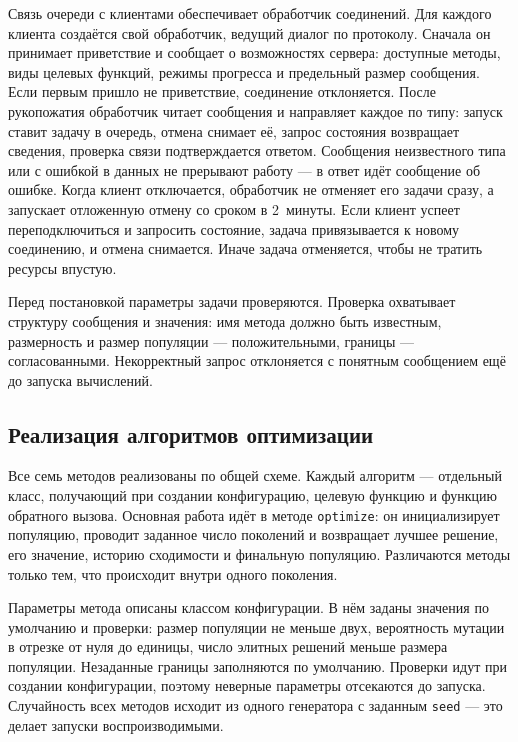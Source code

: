\documentclass[14pt, a4paper]{extarticle}
\begin{document}
Связь очереди с клиентами обеспечивает обработчик соединений. Для каждого клиента
создаётся свой обработчик, ведущий диалог по протоколу. Сначала он принимает
приветствие и сообщает о возможностях сервера: доступные методы, виды целевых
функций, режимы прогресса и предельный размер сообщения. Если первым пришло не
приветствие, соединение отклоняется. После рукопожатия обработчик читает сообщения
и направляет каждое по типу: запуск ставит задачу в очередь, отмена снимает её,
запрос состояния возвращает сведения, проверка связи подтверждается ответом.
Сообщения неизвестного типа или с ошибкой в данных не прерывают работу --- в ответ
идёт сообщение об ошибке. Когда клиент отключается, обработчик не отменяет его
задачи сразу, а запускает отложенную отмену со сроком в 2~минуты. Если клиент успеет
переподключиться и запросить состояние, задача привязывается к новому соединению, и
отмена снимается. Иначе задача отменяется, чтобы не тратить ресурсы впустую.

Перед постановкой параметры задачи проверяются. Проверка охватывает структуру
сообщения и значения: имя метода должно быть известным, размерность и размер
популяции --- положительными, границы --- согласованными. Некорректный запрос
отклоняется с понятным сообщением ещё до запуска вычислений.

\subsection{Реализация алгоритмов оптимизации}
\label{subsec:algo-impl}

Все семь методов реализованы по общей схеме. Каждый алгоритм --- отдельный класс,
получающий при создании конфигурацию, целевую функцию и функцию обратного вызова.
Основная работа идёт в методе \texttt{optimize}: он инициализирует популяцию,
проводит заданное число поколений и возвращает лучшее решение, его значение,
историю сходимости и финальную популяцию. Различаются методы только тем, что
происходит внутри одного поколения.

Параметры метода описаны классом конфигурации. В нём заданы значения по умолчанию
и проверки: размер популяции не меньше двух, вероятность мутации в отрезке от нуля
до единицы, число элитных решений меньше размера популяции. Незаданные границы
заполняются по умолчанию. Проверки идут при создании конфигурации, поэтому неверные
параметры отсекаются до запуска. Случайность всех методов исходит из одного
генератора с заданным \texttt{seed} --- это делает запуски воспроизводимыми.
\end{document}
